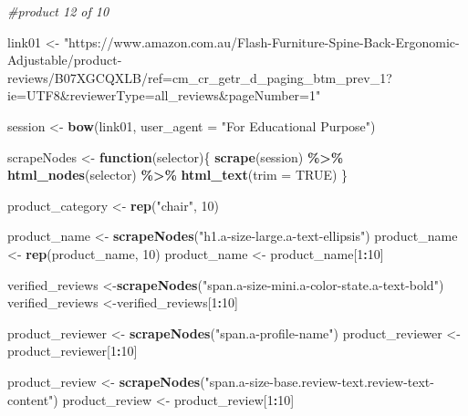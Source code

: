 \documentclass[
]{article}
\newenvironment{Shaded}{\begin{snugshade}}{\end{snugshade}}
\newcommand{\AttributeTok}[1]{\textcolor[rgb]{0.13,0.29,0.53}{#1}}
\newcommand{\CommentTok}[1]{\textcolor[rgb]{0.56,0.35,0.01}{\textit{#1}}}
\newcommand{\ConstantTok}[1]{\textcolor[rgb]{0.56,0.35,0.01}{#1}}
\newcommand{\ControlFlowTok}[1]{\textcolor[rgb]{0.13,0.29,0.53}{\textbf{#1}}}
\newcommand{\DecValTok}[1]{\textcolor[rgb]{0.00,0.00,0.81}{#1}}
\newcommand{\FunctionTok}[1]{\textcolor[rgb]{0.13,0.29,0.53}{\textbf{#1}}}
\newcommand{\NormalTok}[1]{#1}
\newcommand{\OtherTok}[1]{\textcolor[rgb]{0.56,0.35,0.01}{#1}}
\newcommand{\SpecialCharTok}[1]{\textcolor[rgb]{0.81,0.36,0.00}{\textbf{#1}}}
\newcommand{\StringTok}[1]{\textcolor[rgb]{0.31,0.60,0.02}{#1}}
\begin{document}
\begin{Shaded}
\begin{Highlighting}[]
\CommentTok{\#product 12 of 10}

\NormalTok{link01 }\OtherTok{\textless{}{-}} \StringTok{"https://www.amazon.com.au/Flash{-}Furniture{-}Spine{-}Back{-}Ergonomic{-}Adjustable/product{-}reviews/B07XGCQXLB/ref=cm\_cr\_getr\_d\_paging\_btm\_prev\_1?ie=UTF8\&reviewerType=all\_reviews\&pageNumber=1"}


\NormalTok{  session }\OtherTok{\textless{}{-}} \FunctionTok{bow}\NormalTok{(link01,}
               \AttributeTok{user\_agent =} \StringTok{"For Educational Purpose"}\NormalTok{)}

\NormalTok{  scrapeNodes }\OtherTok{\textless{}{-}} \ControlFlowTok{function}\NormalTok{(selector)\{}
    \FunctionTok{scrape}\NormalTok{(session) }\SpecialCharTok{\%\textgreater{}\%}
      \FunctionTok{html\_nodes}\NormalTok{(selector) }\SpecialCharTok{\%\textgreater{}\%}
      \FunctionTok{html\_text}\NormalTok{(}\AttributeTok{trim =} \ConstantTok{TRUE}\NormalTok{)}
\NormalTok{  \}}

\NormalTok{  product\_category }\OtherTok{\textless{}{-}} \FunctionTok{rep}\NormalTok{(}\StringTok{"chair"}\NormalTok{, }\DecValTok{10}\NormalTok{)}

\NormalTok{  product\_name }\OtherTok{\textless{}{-}} \FunctionTok{scrapeNodes}\NormalTok{(}\StringTok{"h1.a{-}size{-}large.a{-}text{-}ellipsis"}\NormalTok{)}
\NormalTok{  product\_name }\OtherTok{\textless{}{-}} \FunctionTok{rep}\NormalTok{(product\_name, }\DecValTok{10}\NormalTok{)}
\NormalTok{  product\_name }\OtherTok{\textless{}{-}}\NormalTok{ product\_name[}\DecValTok{1}\SpecialCharTok{:}\DecValTok{10}\NormalTok{]}
  
\NormalTok{  verified\_reviews }\OtherTok{\textless{}{-}}\FunctionTok{scrapeNodes}\NormalTok{(}\StringTok{"span.a{-}size{-}mini.a{-}color{-}state.a{-}text{-}bold"}\NormalTok{)}
\NormalTok{  verified\_reviews }\OtherTok{\textless{}{-}}\NormalTok{verified\_reviews[}\DecValTok{1}\SpecialCharTok{:}\DecValTok{10}\NormalTok{]}
  
\NormalTok{  product\_reviewer }\OtherTok{\textless{}{-}} \FunctionTok{scrapeNodes}\NormalTok{(}\StringTok{"span.a{-}profile{-}name"}\NormalTok{)}
\NormalTok{  product\_reviewer }\OtherTok{\textless{}{-}}\NormalTok{ product\_reviewer[}\DecValTok{1}\SpecialCharTok{:}\DecValTok{10}\NormalTok{]}
  
\NormalTok{  product\_review }\OtherTok{\textless{}{-}} \FunctionTok{scrapeNodes}\NormalTok{(}\StringTok{"span.a{-}size{-}base.review{-}text.review{-}text{-}content"}\NormalTok{)}
\NormalTok{  product\_review }\OtherTok{\textless{}{-}}\NormalTok{ product\_review[}\DecValTok{1}\SpecialCharTok{:}\DecValTok{10}\NormalTok{]}
  

\end{Highlighting}
\end{Shaded}
\end{document}
